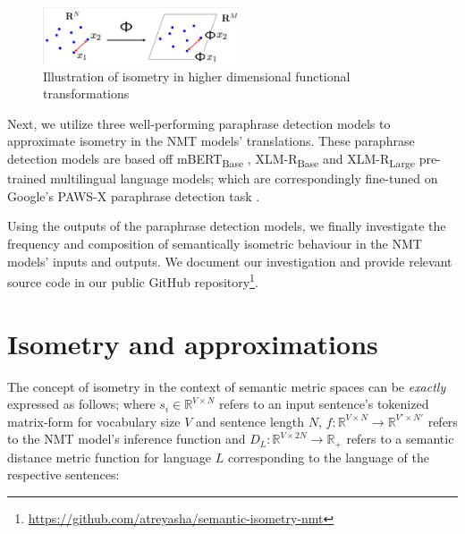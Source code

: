 \documentclass[11pt,a4paper]{article}
\begin{document}
\begin{figure}
  \centering
  \includegraphics[trim={1.0cm 0cm 0cm 1.0cm},clip,width=0.52\textwidth]{isometry_visualized.png}
  \caption{Illustration of isometry in higher dimensional functional transformations \citep{Hegde-Numax}}
  \label{isometry_visual}
\end{figure}

Next, we utilize three well-performing paraphrase detection models to approximate isometry in the NMT models' translations. These paraphrase detection models are based off mBERT\textsubscript{Base} \cite{devlin-etal-2019-bert}, XLM-R\textsubscript{Base} \cite{conneau2019unsupervised} and XLM-R\textsubscript{Large} \cite{conneau2019unsupervised} pre-trained multilingual language models; which are correspondingly fine-tuned on Google's PAWS-X paraphrase detection task \cite{pawsx2019emnlp, hu2020xtreme}.
 
Using the outputs of the paraphrase detection models, we finally investigate the frequency and composition of semantically isometric behaviour in the NMT models' inputs and outputs. We document our investigation and provide relevant source code in our public GitHub repository\footnote{\url{https://github.com/atreyasha/semantic-isometry-nmt}}.


\section{Isometry and approximations}

The concept of isometry in the context of semantic metric spaces can be \textit{exactly} expressed as follows; where $s_i \in \mathbb{R}^{V \times N}$ refers to an input sentence's tokenized matrix-form for vocabulary size $V$ and sentence length $N$, $f: \mathbb{R}^{V \times N} \to \mathbb{R}^{V' \times N'}$ refers to the NMT model's inference function and $D_L: \mathbb{R}^{V \times 2N} \to \mathbb{R}_+$ refers to a semantic distance metric function for language $L$ corresponding to the language of the respective sentences:
\end{document}
